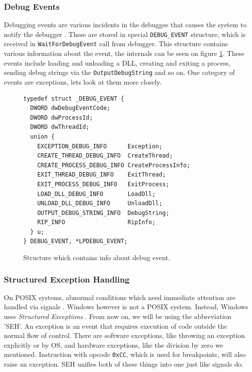\subsubsection*{Debug Events}\label{section:Debug Events}
Debugging events are various incidents in the debuggee that causes the system
to notify the debugger \cite{windows-msdn-debug-events}. These are stored in
special \texttt{DEBUG_EVENT} structure, which is received in
\texttt{WaitForDebugEvent} call from debugger. This structure contains various
information about the event, the internals can be seen on figure
\ref{fig:DebugEvent}. These events include loading and unloading a DLL,
creating and exiting a process, sending debug strings via the
\texttt{OutputDebugString} and so on. One category of events
are exceptions, lets look at them more closely.

\begin{figure}
\begin{verbatim}
typedef struct _DEBUG_EVENT {
  DWORD dwDebugEventCode;
  DWORD dwProcessId;
  DWORD dwThreadId;
  union {
    EXCEPTION_DEBUG_INFO      Exception;
    CREATE_THREAD_DEBUG_INFO  CreateThread;
    CREATE_PROCESS_DEBUG_INFO CreateProcessInfo;
    EXIT_THREAD_DEBUG_INFO    ExitThread;
    EXIT_PROCESS_DEBUG_INFO   ExitProcess;
    LOAD_DLL_DEBUG_INFO       LoadDll;
    UNLOAD_DLL_DEBUG_INFO     UnloadDll;
    OUTPUT_DEBUG_STRING_INFO  DebugString;
    RIP_INFO                  RipInfo;
  } u;
} DEBUG_EVENT, *LPDEBUG_EVENT;
\end{verbatim}
\caption{Structure which contains info about debug event.}
\label{fig:DebugEvent}
\end{figure}

\subsubsection*{Structured Exception Handling}
On POSIX systems, abnormal conditions which need immediate attention are
handled via signals . Windows however is not a POSIX system.
Instead, Windows uses \textit{Structured Exceptions} \cite{windows-msdn-seh}.
From now on, we will be using the abbreviation 'SEH'. An exception is an event
that requires execution of code outside the normal flow of control. There are
software exceptions, like throwing an exception explicitly or by OS, and
hardware exceptions, like the division by zero we mentioned. Instruction with
opcode \texttt{0xCC}, which is used for breakpoints, will also raise an
exception. SEH unifies both of these things into one just like signals do.

